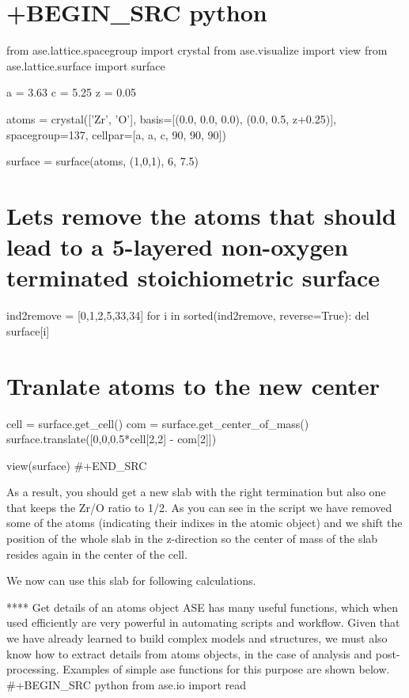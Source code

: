 \documentclass[11pt]{article}
\begin{document}
\section{+BEGIN\_SRC python}\label{begin_src-python-5}

from ase.lattice.spacegroup import crystal from ase.visualize import
view from ase.lattice.surface import surface

a = 3.63 c = 5.25 z = 0.05

atoms = crystal({[}'Zr', 'O'{]}, basis={[}(0.0, 0.0, 0.0), (0.0, 0.5,
z+0.25){]}, spacegroup=137, cellpar={[}a, a, c, 90, 90, 90{]})

surface = surface(atoms, (1,0,1), 6, 7.5)

\section{Lets remove the atoms that should lead to a 5-layered
non-oxygen terminated stoichiometric
surface}\label{lets-remove-the-atoms-that-should-lead-to-a-5-layered-non-oxygen-terminated-stoichiometric-surface}

ind2remove = {[}0,1,2,5,33,34{]} for i in sorted(ind2remove,
reverse=True): del surface{[}i{]}

\section{Tranlate atoms to the new
center}\label{tranlate-atoms-to-the-new-center}

cell = surface.get\_cell() com = surface.get\_center\_of\_mass()
surface.translate({[}0,0,0.5*cell{[}2,2{]} - com{[}2{]}{]})

view(surface) \#+END\_SRC

As a result, you should get a new slab with the right termination but
also one that keeps the Zr/O ratio to 1/2. As you can see in the script
we have removed some of the atoms (indicating their indixes in the
atomic object) and we shift the position of the whole slab in the
z-direction so the center of mass of the slab resides again in the
center of the cell.

We now can use this slab for following calculations.

**** Get details of an atoms object ASE has many useful functions, which
when used efficiently are very powerful in automating scripts and
workflow. Given that we have already learned to build complex models and
structures, we must also know how to extract details from atoms objects,
in the case of analysis and post-processing. Examples of simple ase
functions for this purpose are shown below. \#+BEGIN\_SRC python from
ase.io import read
\end{document}
